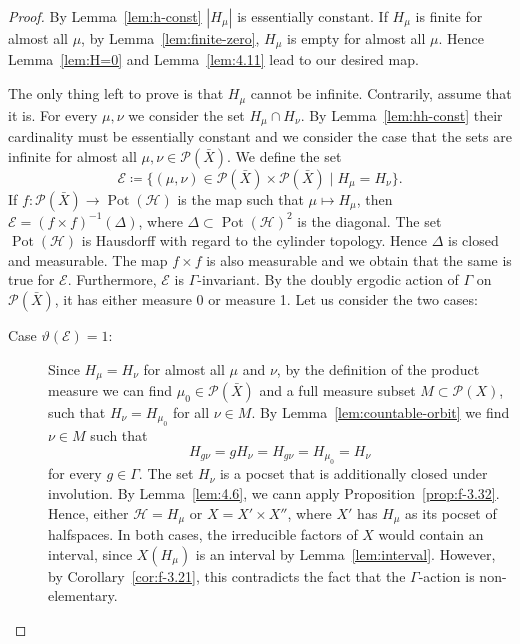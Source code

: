 \begin{proof}
  By Lemma~\ref{lem:h-const} \(|H_\mu|\) is essentially constant.
  If \(H_\mu\) is finite for almost all \(\mu\), by Lemma~\ref{lem:finite-zero}, \(H_\mu\) is empty for almost all \(\mu\). Hence Lemma~\ref{lem:H=0} and Lemma~\ref{lem:4.11} lead to our desired map.

  The only thing left to prove is that \(H_\mu\) cannot be infinite. Contrarily, assume that it is. For every \(\mu, \nu\) we consider the set \(H_\mu \cap H_\nu\). By Lemma~\ref{lem:hh-const} their cardinality must be essentially constant and we consider the case that the sets are infinite for almost all \(\mu, \nu \in \mathcal{P}(\bar X)\).
  We define the set
  \[
    \mathcal{E} \coloneqq \{(\mu, \nu) \in \mathcal{P}(\bar X) \times \mathcal{P}(\bar X)\mid H_\mu = H_\nu\}.
  \]
  If \(f\colon \mathcal{P}(\bar X) \to \operatorname{Pot}(\mathcal{H})\) is the map such that  \(\mu \mapsto H_\mu\), then \(\mathcal{E} = (f \times f)^{-1}(\Delta)\), where \(\Delta \subset \operatorname{Pot}(\mathcal{H})^2\) is the diagonal. The set \(\operatorname{Pot}(\mathcal{H})\) is Hausdorff with regard to the cylinder topology. Hence \(\Delta\) is closed and measurable. The map \(f \times f\) is also measurable and we obtain that the same is true for \(\mathcal{E}\). Furthermore, \(\mathcal{E}\) is \(\Gamma\)-invariant.  By the doubly ergodic action of \(\Gamma\) on \(\mathcal{P}(\bar X)\), it has either measure 0 or measure 1. Let us consider the two cases:
  \begin{description}
  \item[Case \(\vartheta(\mathcal{E})=1\):] Since \(H_\mu = H_\nu\) for almost all \(\mu\) and \(\nu\), by the definition of the product measure we can find \(\mu_0 \in \mathcal{P}(\bar X)\) and a full measure subset \(M \subset \mathcal{P}(X)\), such that \(H_\nu = H_{\mu_0}\) for all \(\nu \in M\). By Lemma~\ref{lem:countable-orbit} we find \(\nu \in M\) such that
    \[
      H_{g\nu} = gH_\nu = H_{g\nu} = H_{\mu_0} = H_\nu
    \]
    for every \(g \in \Gamma\). The set \(H_\nu\) is a pocset that is additionally closed under involution. By Lemma~\ref{lem:4.6}, we cann apply Proposition~\ref{prop:f-3.32}. Hence, either \(\mathcal{H} = H_\mu\) or \(X = X' \times X''\), where \(X'\) has \(H_\mu\) as its pocset of halfspaces. In both cases, the irreducible factors of \(X\) would contain an interval, since \(X(H_\mu)\) is an interval by Lemma~\ref{lem:interval}. However, by Corollary~\ref{cor:f-3.21}, this contradicts the fact that the \(\Gamma\)-action is non-elementary.

\end{description}
\end{proof}
